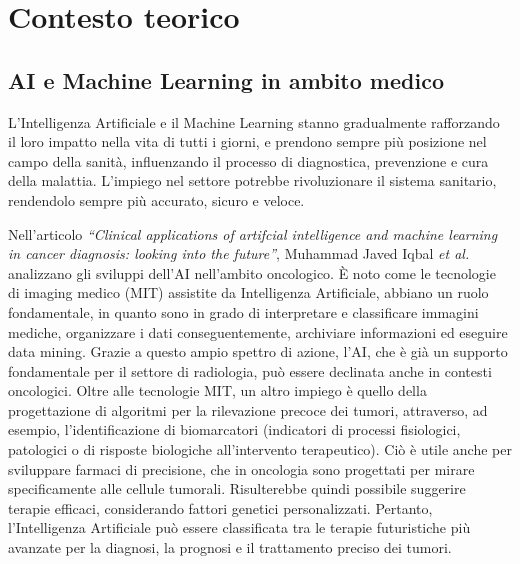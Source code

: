\chapter{Contesto teorico}
\label{ch:capitolo1}


\section{AI e Machine Learning in ambito medico}
\label{sec:AIambitoMedico}

L’Intelligenza Artificiale e il Machine Learning stanno gradualmente rafforzando il loro impatto nella vita di tutti i giorni, e prendono sempre più posizione nel campo della sanità, influenzando il processo di diagnostica, prevenzione e cura della malattia.
\newline
L'impiego nel settore potrebbe rivoluzionare il sistema sanitario, rendendolo sempre più accurato, sicuro e veloce.

Nell’articolo \textit{“Clinical applications of artifcial intelligence and machine learning in cancer diagnosis: looking into the future”}\cite{cancerDiagnosis}, Muhammad Javed Iqbal \textit{et al.} analizzano gli sviluppi dell’AI nell’ambito oncologico.
\newline
È noto come le tecnologie di imaging medico (MIT) assistite da Intelligenza Artificiale, abbiano un ruolo fondamentale, in quanto sono in grado di interpretare e classificare immagini mediche, organizzare i dati conseguentemente, archiviare informazioni ed eseguire data mining. Grazie a questo ampio spettro di azione, l’AI, che è già un supporto fondamentale per il settore di radiologia, può essere declinata anche in contesti oncologici.
\newline
Oltre alle tecnologie MIT, un altro impiego è quello della progettazione di algoritmi per la rilevazione precoce dei tumori, attraverso, ad esempio, l'identificazione di biomarcatori (indicatori di processi fisiologici, patologici o di risposte biologiche all'intervento terapeutico). Ciò è utile anche per sviluppare farmaci di precisione, che in oncologia sono progettati per mirare specificamente alle cellule tumorali. Risulterebbe quindi possibile suggerire terapie efficaci, considerando fattori genetici personalizzati. 
\newline
Pertanto, l'Intelligenza Artificiale può essere classificata tra le terapie futuristiche più avanzate per la diagnosi, la prognosi e il trattamento preciso dei tumori.

